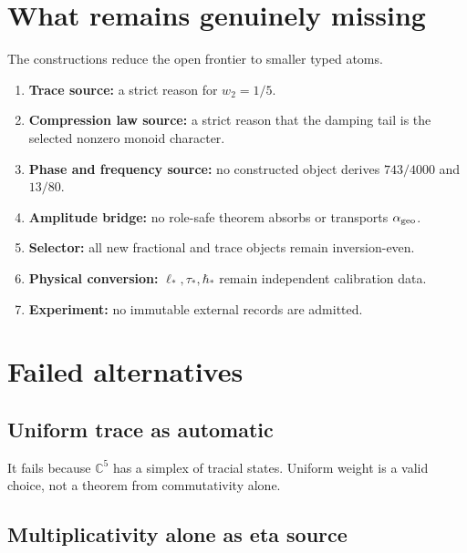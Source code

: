 \documentclass[11pt,a4paper,openany]{report}
\begin{document}
\section{What remains genuinely missing}

The constructions reduce the open frontier to smaller typed atoms.

\begin{enumerate}
\item 
\textbf{Trace source:} a strict reason for \(w_2=1/5\).

\item 
\textbf{Compression law source:} a strict reason that the damping tail is the selected nonzero monoid character.

\item 
\textbf{Phase and frequency source:} no constructed object derives \(743/4000\) and \(13/80\).

\item 
\textbf{Amplitude bridge:} no role-safe theorem absorbs or transports \(\alpha_{\rm geo}\).

\item 
\textbf{Selector:} all new fractional and trace objects remain inversion-even.

\item 
\textbf{Physical conversion:} \(\ell_*,\tau_*,\hbar_*\) remain independent calibration data.

\item 
\textbf{Experiment:} no immutable external records are admitted.

\end{enumerate}

\section{Failed alternatives}

\subsection{Uniform trace as automatic}

It fails because \(\mathbb C^5\) has a simplex of tracial states. Uniform weight is a valid choice, not a theorem from commutativity alone.

\subsection{Multiplicativity alone as eta source}
\end{document}
